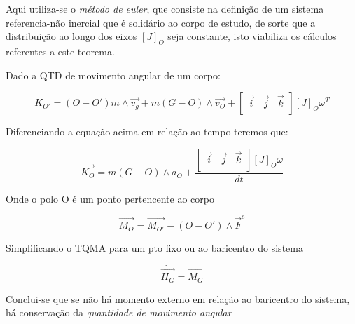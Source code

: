 \begin{namedtheorem}
Aqui utiliza-se o \textit{método de euler}, que consiste na definição de um sistema referencia-não inercial que é solidário ao corpo de estudo, de sorte que a distribuição ao longo dos eixos $[J]_O$ seja constante, isto viabiliza os cálculos referentes a este teorema.

Dado a QTD de movimento angular de um corpo:

$$K_{O'} = (O-O')m\wedge\vec{v_g} + m(G-O)\wedge \vec{v_O} + \begin{bmatrix}\vec{i} & \vec{j} & \vec{k} \\ \end{bmatrix}[J]_O\omega^T $$

Diferenciando a equação acima em relação ao tempo teremos que:

$$\dot{\vec{K_{O}}} = m(G-O)\wedge a_O + \frac{\begin{bmatrix}\vec{i} & \vec{j} & \vec{k} \\ \end{bmatrix}[J]_O\omega}{dt} $$

Onde o polo O é um ponto pertencente ao corpo
\end{namedtheorem}

\begin{namedtheorem}

$$\vec{M_{O}} = \vec{M_{O'}} - (O - O')\wedge \vec{F}^e$$

\end{namedtheorem}

Simplificando o TQMA para um pto fixo ou ao baricentro do sistema

\begin{namedtheorem}

$$\dot{\vec{H_{G}}} = \vec{M_G}$$

Conclui-se que se não há momento externo em relação ao baricentro do sistema, há conservação da \textit{quantidade de movimento angular}

\end{namedtheorem}















